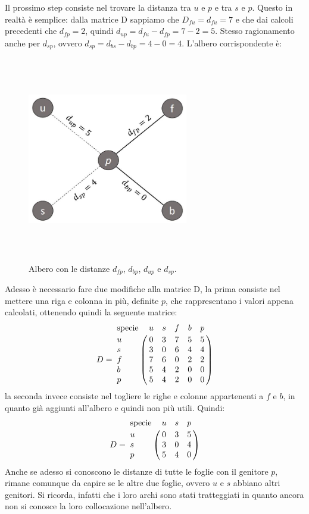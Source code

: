 \newline
Il prossimo step consiste nel trovare la distanza tra $u$ e $p$ e tra $s$ e $p$. Questo in realtà è semplice: dalla matrice D sappiamo che $D_{fu}=d_{fu}=7$ e che dai calcoli precedenti che $d_{fp}=2$, quindi $d_{up}=d_{fu}-d_{fp}=7-2=5$. Stesso ragionamento anche per $d_{sp}$, ovvero $d_{sp}=d_{bs}-d_{bp}=4-0=4$.
\newline
L'albero corrispondente è:
\newpage
\begin{figure}[h!]
\centering
	\includegraphics[height=9cm, width=7cm, keepaspectratio]{distance_between_f_b_part_4.jpg}
 	\caption{Albero con le distanze $d_{fp}$, $d_{bp}$, $d_{up}$ e $d_{sp}$.}
  	\label{fig:neighborsleaves_3}
\end{figure}
Adesso è necessario fare due modifiche alla matrice D, la prima consiste nel mettere una riga e colonna in più, definite $p$, che rappresentano i valori appena calcolati, ottenendo quindi la seguente matrice:
\[
D = \bordermatrix{\text{specie}&u&s&f&b&p\cr
                u& 0 & 3 & 7 & 5 & 5\cr
                s& 3 & 0 & 6 & 4 & 4\cr
                f& 7 & 6 & 0 & 2 & 2\cr
                b& 5 & 4 & 2 & 0 & 0\cr
                p&  5 & 4 & 2 & 0 & 0}
\]
la seconda invece consiste nel togliere le righe e colonne appartenenti a $f$ e $b$, in quanto già aggiunti all'albero e quindi non più utili. Quindi:
\[
D = \bordermatrix{\text{specie}&u&s&p\cr
                u& 0 & 3 & 5\cr
                s& 3 & 0 & 4\cr
                p&  5 & 4 & 0}
\]
Anche se adesso si conoscono le distanze di tutte le foglie con il genitore $p$, rimane comunque da capire se le altre due foglie, ovvero $u$ e $s$ abbiano altri genitori. Si ricorda, infatti che i loro archi sono stati tratteggiati in quanto ancora non si conosce la loro collocazione nell'albero.
